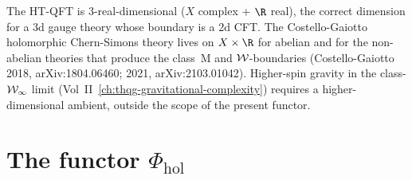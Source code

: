 \begin{remark}
\label{rem:uhf-geometry-one-real-direction}
The HT-QFT is 3-real-dimensional ($X$ complex + $\R$ real), the
correct dimension for a 3d gauge theory whose boundary is a 2d CFT.
The Costello-Gaiotto holomorphic Chern-Simons theory lives on
$X \times \R$ for abelian and for the non-abelian theories that
produce the class~M and $\mathcal{W}$-boundaries (Costello-Gaiotto 2018,
arXiv:1804.06460; 2021, arXiv:2103.01042). Higher-spin gravity in
the class-$\mathcal{W}_\infty$ limit (Vol~II~\ref*{ch:thqg-gravitational-complexity})
requires a higher-dimensional ambient, outside the scope of the
present functor.
\end{remark}

\section{The functor $\Phi_{\mathrm{hol}}$}
\label{sec:uhf-functor}

